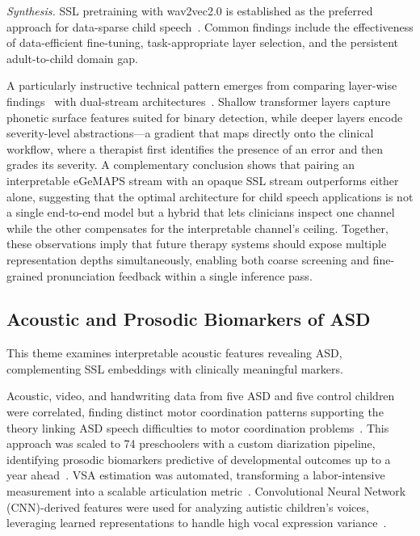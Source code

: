 \documentclass[conference]{IEEEtran}
\begin{document}
\emph{Synthesis.} SSL pretraining with wav2vec2.0 is established as the preferred approach for data-sparse child speech~\cite{ref1,ref2,ref3,ref4,ref5}. Common findings include the effectiveness of data-efficient fine-tuning, task-appropriate layer selection, and the persistent adult-to-child domain gap.

A particularly instructive technical pattern emerges from comparing layer-wise findings~\cite{ref4} with dual-stream architectures~\cite{ref2}. Shallow transformer layers capture phonetic surface features suited for binary detection, while deeper layers encode severity-level abstractions---a gradient that maps directly onto the clinical workflow, where a therapist first identifies the presence of an error and then grades its severity. A complementary conclusion shows that pairing an interpretable eGeMAPS stream with an opaque SSL stream outperforms either alone, suggesting that the optimal architecture for child speech applications is not a single end-to-end model but a hybrid that lets clinicians inspect one channel while the other compensates for the interpretable channel's ceiling. Together, these observations imply that future therapy systems should expose multiple representation depths simultaneously, enabling both coarse screening and fine-grained pronunciation feedback within a single inference pass.

\subsection{Acoustic and Prosodic Biomarkers of ASD}

This theme examines interpretable acoustic features revealing ASD, complementing SSL embeddings with clinically meaningful markers.

Acoustic, video, and handwriting data from five ASD and five control children were correlated, finding distinct motor coordination patterns supporting the theory linking ASD speech difficulties to motor coordination problems~\cite{ref6}. This approach was scaled to 74 preschoolers with a custom diarization pipeline, identifying prosodic biomarkers predictive of developmental outcomes up to a year ahead~\cite{ref7}. VSA estimation was automated, transforming a labor-intensive measurement into a scalable articulation metric~\cite{ref8}. Convolutional Neural Network (CNN)-derived features were used for analyzing autistic children's voices, leveraging learned representations to handle high vocal expression variance~\cite{ref9}.
\end{document}
